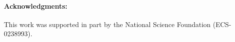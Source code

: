 \documentclass[conference]{IEEEtran}
\begin{document}

\paragraph{Acknowledgments:} This work was supported in part by the National
Science Foundation (ECS-0238993).



\end{document}
